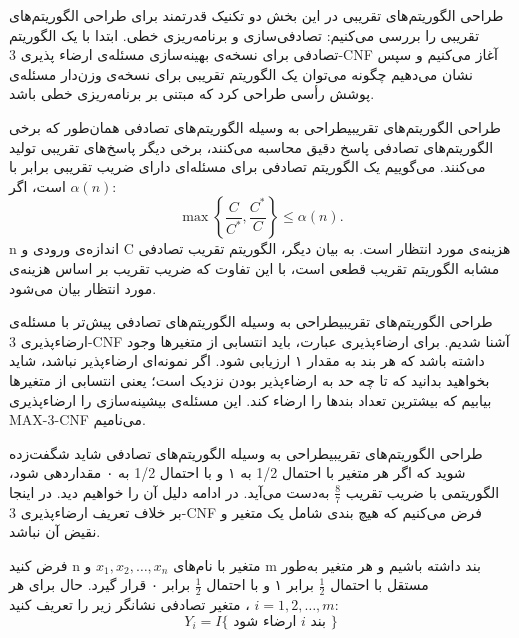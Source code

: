 \begin{itemframe}{طراحی الگوریتم‌های تقریبی}
\itm
در این بخش دو تکنیک قدرتمند برای طراحی الگوریتم‌های تقریبی را بررسی می‌کنیم:
تصادفی‌سازی و برنامه‌ریزی خطی.
\itm
ابتدا با یک الگوریتم تصادفی برای نسخه‌ی بهینه‌سازی مسئله‌ی ارضاء پذیری 3-CNF آغاز می‌کنیم
و سپس نشان می‌دهیم چگونه می‌توان یک الگوریتم تقریبی برای نسخه‌ی وزن‌دار مسئله‌ی پوشش رأسی طراحی کرد که مبتنی بر برنامه‌ریزی خطی باشد.
\end{itemframe}


\begin{itemframe-s}{طراحی الگوریتم‌های تقریبی}{طراحی به وسیله الگوریتم‌های تصادفی}
\itm
همان‌طور که برخی الگوریتم‌های تصادفی پاسخ دقیق محاسبه می‌کنند، برخی دیگر پاسخ‌های تقریبی تولید می‌کنند.
\itm
می‌گوییم یک الگوریتم تصادفی برای مسئله‌ای دارای ضریب تقریبی برابر با
$\alpha(n)$
است، اگر:
$$
\max \left\{ \frac{C}{C^{\ast}}, \frac{C^{\ast}}{C} \right\} \leq \alpha(n).
$$
n
اندازه‌ی ورودی و C هزینه‌ی مورد انتظار است.
\itm
به بیان دیگر، الگوریتم تقریب تصادفی مشابه الگوریتم تقریب قطعی است، با این تفاوت که ضریب تقریب بر اساس هزینه‌ی مورد انتظار بیان می‌شود.
\end{itemframe-s}


\begin{itemframe-s}{طراحی الگوریتم‌های تقریبی}{طراحی به وسیله الگوریتم‌های تصادفی}
\itm
پیش‌تر با مسئله‌ی ارضاء‌پذیری 3-CNF آشنا شدیم. برای ارضاء‌پذیری عبارت، باید انتسابی از متغیرها وجود داشته باشد که هر بند
 به مقدار ۱ ارزیابی شود.
\itm
اگر نمونه‌ای ارضاء‌پذیر نباشد، شاید بخواهید بدانید که تا چه حد به ارضاء‌پذیر بودن نزدیک است؛ یعنی انتسابی از متغیرها بیابیم که بیشترین تعداد بندها را ارضاء کند. این مسئله‌ی بیشینه‌سازی را ارضاء‌پذیری
MAX-3-CNF
می‌نامیم.

\end{itemframe-s}


\begin{itemframe-s}{طراحی الگوریتم‌های تقریبی}{طراحی به وسیله الگوریتم‌های تصادفی}
\itm
شاید شگفت‌زده شوید که اگر هر متغیر با احتمال 1/2 به ۱ و با احتمال 1/2 به ۰ مقداردهی شود، الگوریتمی با ضریب تقریب
$\frac{8}{7}$
 به‌دست می‌آید. در ادامه دلیل آن را خواهیم دید.
\itm
در اینجا بر خلاف تعریف ارضاء‌پذیری 3-CNF فرض می‌کنیم که هیچ بندی شامل یک متغیر و نقیض آن نباشد.

\itm
فرض کنید n متغیر با نام‌های
$x_1, x_2, \dots, x_n$
 و m بند داشته باشیم و هر متغیر به‌طور مستقل با احتمال
$\frac{1}{2}$
 برابر ۱ و با احتمال
$\frac{1}{2}$
 برابر ۰ قرار گیرد.
حال برای هر
$i = 1, 2, \dots, m$
، متغیر تصادفی نشانگر زیر را تعریف کنید:
$$Y_i = I\{\text{ ارضاء شود } i \text{ بند }\}$$
\end{itemframe-s}


